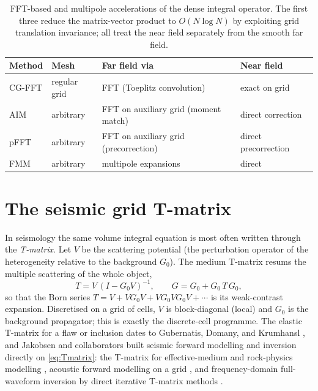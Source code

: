 \documentclass[11pt,a4paper]{article}
\begin{document}
\begin{table}[h]
\centering
\renewcommand{\arraystretch}{1.25}
\begin{tabular}{@{}llll@{}}
\toprule
Method & Mesh & Far field via & Near field \\
\midrule
CG-FFT & regular grid & FFT (Toeplitz convolution) & exact on grid \\
AIM & arbitrary & FFT on auxiliary grid (moment match) & direct correction \\
pFFT & arbitrary & FFT on auxiliary grid (precorrection) & direct precorrection \\
FMM & arbitrary & multipole expansions & direct \\
\bottomrule
\end{tabular}
\caption{FFT-based and multipole accelerations of the dense integral operator. The first three
reduce the matrix-vector product to $O(N\log N)$ by exploiting grid translation invariance; all
treat the near field separately from the smooth far field.}
\end{table}

\section{The seismic grid T-matrix}

In seismology the same volume integral equation is most often written through the
\emph{T-matrix}. Let $V$ be the scattering potential (the perturbation operator of the
heterogeneity relative to the background $G_0$). The medium T-matrix resums the multiple
scattering of the whole object,
\begin{equation}
\label{eq:Tmatrix}
T=V\,(I-G_0 V)^{-1}, \qquad G=G_0+G_0\,T\,G_0,
\end{equation}
so that the Born series $T=V+VG_0V+VG_0VG_0V+\cdots$ is its weak-contrast expansion. Discretised
on a grid of cells, $V$ is block-diagonal (local) and $G_0$ is the background propagator; this
is exactly the discrete-cell programme. The elastic T-matrix for a flaw or inclusion dates to
Gubernatis, Domany, and Krumhansl \cite{GubernatisDomanyKrumhansl1977}, and Jakobsen and
collaborators built seismic forward modelling and inversion directly on \eqref{eq:Tmatrix}:
the T-matrix for effective-medium and rock-physics modelling \cite{JakobsenHudsonJohansen2003},
acoustic forward modelling on a grid \cite{Jakobsen2012}, and frequency-domain full-waveform
inversion by direct iterative T-matrix methods \cite{JakobsenUrsin2015}.
\end{document}
